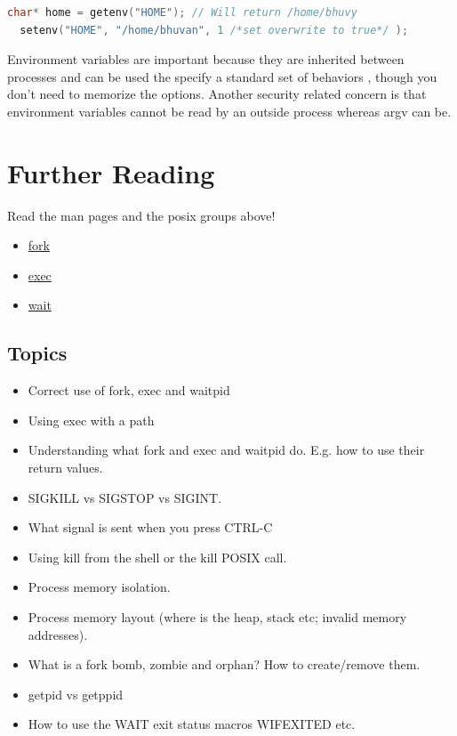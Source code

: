 \begin{lstlisting}[language=C]
  char* home = getenv("HOME"); // Will return /home/bhuvy
  setenv("HOME", "/home/bhuvan", 1 /*set overwrite to true*/ );
\end{lstlisting}

Environment variables are important because they are inherited between processes and can be used the specify a standard set of behaviors \cite{env_std_2018}, though you don't need to memorize the options.
Another security related concern is that environment variables cannot be read by an outside process whereas argv can be.

\section{Further Reading}

Read the man pages and the posix groups above!

\begin{itemize}
\item \href{http://man7.org/linux/man-pages/man2/fork.2.html}{fork}
\item \href{http://man7.org/linux/man-pages/man3/exec.3.html}{exec}
\item \href{http://man7.org/linux/man-pages/man2/wait.2.html}{wait}
\end{itemize}

\subsection{Topics}

\begin{itemize}
\item
  Correct use of fork, exec and waitpid
\item
  Using exec with a path
\item
  Understanding what fork and exec and waitpid do. E.g. how to use their return values.
\item
  SIGKILL vs SIGSTOP vs SIGINT.
\item
  What signal is sent when you press CTRL-C
\item
  Using kill from the shell or the kill POSIX call.
\item
  Process memory isolation.
\item
  Process memory layout (where is the heap, stack etc; invalid memory addresses).
\item
  What is a fork bomb, zombie and orphan? How to create/remove them.
\item
  getpid vs getppid
\item
  How to use the WAIT exit status macros WIFEXITED etc.
\end{itemize}

